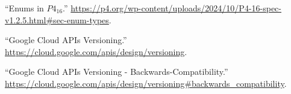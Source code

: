 \documentclass[11pt]{article}
\begin{document}
{{\begin{thebibliography}{45}
\mdbibitemlabel{{}[7]}\textquotedblleft{}Enums in $P4_{16}$.\textquotedblright{} \href{https://p4.org/wp-content/uploads/2024/10/P4-16-spec-v1.2.5.html\%23sec-enum-types}{{\ttfamily https://\hspace{0pt}p4.\hspace{0pt}org/\hspace{0pt}wp-\hspace{0pt}content/\hspace{0pt}uploads/\hspace{0pt}2024/\hspace{0pt}10/\hspace{0pt}P4-\hspace{0pt}16-\hspace{0pt}spec-\hspace{0pt}v1.\hspace{0pt}2.\hspace{0pt}5.\hspace{0pt}html\#\hspace{0pt}sec-\hspace{0pt}enum-\hspace{0pt}types}}.\label{p4enums}%

\mdbibitemlabel{{}[8]}\textquotedblleft{}Google Cloud APIs Versioning.\textquotedblright{} \href{https://cloud.google.com/apis/design/versioning}{{\ttfamily https://\hspace{0pt}cloud.\hspace{0pt}google.\hspace{0pt}com/\hspace{0pt}apis/\hspace{0pt}design/\hspace{0pt}versioning}}.\label{apiversioning}%

\mdbibitemlabel{{}[9]}\textquotedblleft{}Google Cloud APIs Versioning - Backwards-Compatibility.\textquotedblright{} \href{https://cloud.google.com/apis/design/versioning\%23backwards_compatibility}{{\ttfamily https://\hspace{0pt}cloud.\hspace{0pt}google.\hspace{0pt}com/\hspace{0pt}apis/\hspace{0pt}design/\hspace{0pt}versioning\#\hspace{0pt}backwards\_\hspace{0pt}compatibility}}.\label{apiversioningbackwardscompatibility}%


\end{thebibliography}}}
\end{document}
